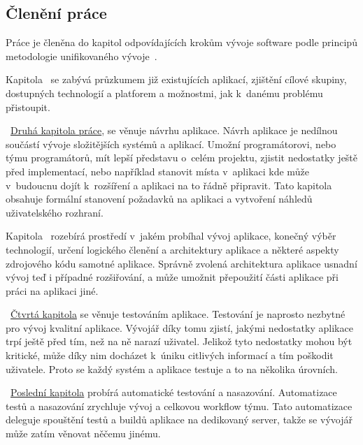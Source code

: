 \begin{introduction}
    \section{Členění práce}
    Práce je členěna do kapitol odpovídajících krokům vývoje software podle principů metodologie unifikovaného vývoje~\cite[s.~51‑68]{arlow_2007_uml}.

    Kapitola~ se zabývá průzkumem již existujících aplikací, zjištění cílové skupiny, dostupných technologií a platforem a možnostmi, jak k~danému problému přistoupit.

    ~\hyperref[ch:design]{Druhá kapitola práce}, se věnuje návrhu aplikace. Návrh aplikace je nedílnou součástí vývoje složitějších systémů a aplikací. Umožní programátorovi, nebo týmu programátorů, mít lepší představu o~celém projektu, zjistit nedostatky ještě před implementací, nebo například stanovit místa v~aplikaci kde může v~budoucnu dojít k~rozšíření a aplikaci na to řádně připravit. Tato kapitola obsahuje formální stanovení požadavků na aplikaci a vytvoření náhledů uživatelského rozhraní.

    Kapitola~ rozebírá prostředí v~jakém probíhal vývoj aplikace, konečný výběr technologií, určení logického členění a architektury aplikace a některé aspekty zdrojového kódu samotné aplikace. Správně zvolená architektura aplikace usnadní vývoj teď i případné rozšiřování, a může umožnit přepoužití části aplikace při práci na aplikaci jiné.

    ~\hyperref[ch:testing]{Čtvrtá kapitola} se věnuje testováním aplikace. Testování je naprosto nezbytné pro vývoj kvalitní aplikace. Vývojář díky tomu zjistí, jakými nedostatky aplikace trpí ještě před tím, než na ně narazí uživatel. Jelikož tyto nedostatky mohou být kritické, může díky nim docházet k~úniku citlivých informací a tím poškodit uživatele. Proto se každý systém a aplikace testuje a to na několika úrovních.

    ~\hyperref[ch:ci_cd]{Poslední kapitola} probírá automatické testování a nasazování. Automatizace testů a nasazování zrychluje vývoj a celkovou workflow týmu. Tato automatizace deleguje spouštění testů a buildů aplikace na dedikovaný server, takže se vývojář může zatím věnovat něčemu jinému.
\end{introduction}